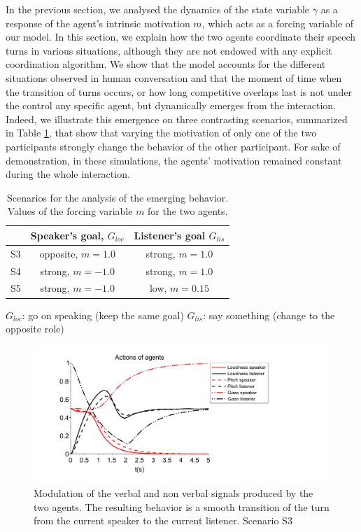 In the previous section, we analysed the dynamics of the state variable $\gamma$ as a response of the agent's intrinsic motivation $m$, which acts as a forcing variable of our model. In this section, we explain how the two agents coordinate their speech turns in various situations, although they are not endowed with any explicit coordination algorithm. We show that the model accounts for the different situations observed in human conversation and that the moment of time when the transition of turns occurs, or how long competitive overlaps last is not under the control any specific agent, but dynamically emerges from the interaction. Indeed, we illustrate this emergence on three contrasting scenarios, summarized in Table \ref{tab_scenarios_emergence}, that show that varying the motivation of only one of the two participants strongly change the behavior of the other participant. For sake of demonstration, in these simulations, the agents' motivation remained constant during the whole interaction. 

\begin{table}
  \begin{center}
    \begin{tabular}{ccc}
      \hline
      \mbox{} & Speaker's goal, $G_{loc}$ & Listener's goal $G_{lis}$\\
      \hline
      S3 & opposite, $m=1.0$ & strong, $m=1.0$\\
      \hline
      S4 & strong, $m=-1.0$ & strong, $m=1.0$\\
      \hline
      S5 & strong, $m=-1.0$ & low, $m=0.15$\\
      \hline
    \end{tabular}
  \end{center}
  $G_{loc}$: go on speaking (keep the same goal)\linebreak
  $G_{lis}$: say something (change to the opposite role)

  \caption{Scenarios for the analysis of the emerging behavior. Values of the forcing variable $m$ for the two agents.}
  \label{tab_scenarios_emergence}
\end{table}

\begin{figure}[b]
  \centering
  \includegraphics[width=\linewidth]{figure/smooth-transition_signal-production.pdf}
  \caption{Modulation of the verbal and non verbal signals produced by the two agents. The resulting behavior is a smooth transition of the turn from the current speaker to the current listener. Scenario S3} 
  \label{simu_smooth}
\end{figure}

